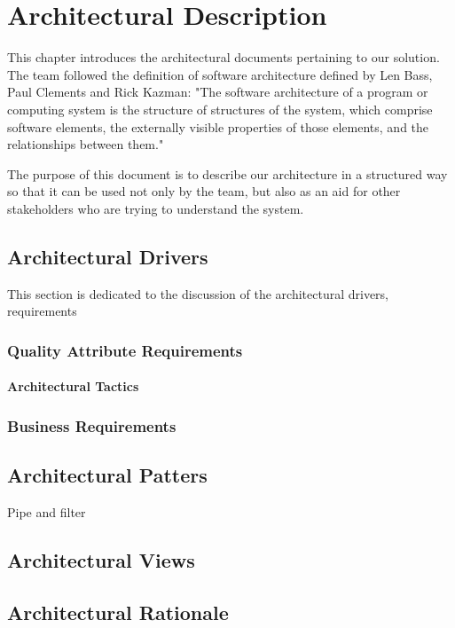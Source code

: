 \chapter{Architectural Description}
This chapter introduces the architectural documents pertaining to our solution. The team followed the definition of software architecture defined by Len Bass, Paul Clements and Rick Kazman: "The software architecture of a program or computing
system is the structure of structures of the system, which comprise software elements, the externally visible properties of those elements, and the relationships between them."

The purpose of this document is to describe our architecture in a structured way so that it can be used not only by the team, but also as an aid for other stakeholders who are trying to understand the system.

\section{Architectural Drivers}
This section is dedicated to the discussion of the architectural drivers, requirements 

\subsection{Quality Attribute Requirements}


\subsubsection{Architectural Tactics}

\subsection{Business Requirements}


\section{Architectural Patters}
Pipe and filter\\


\section{Architectural Views}

\section{Architectural Rationale}

